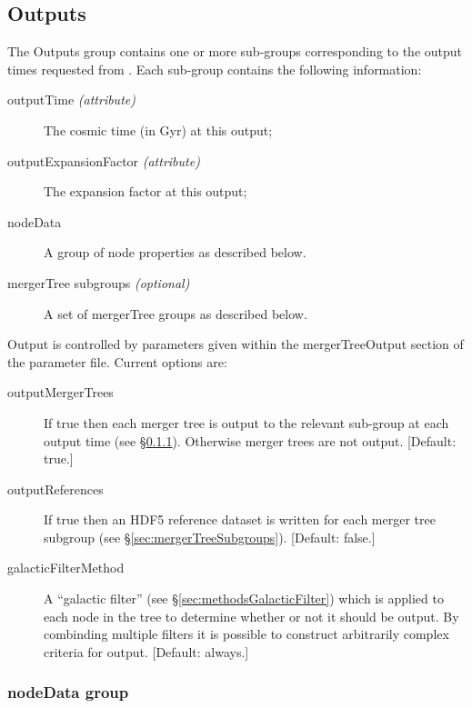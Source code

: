 \subsection{Outputs}

The {\normalfont \ttfamily Outputs} group contains one or more sub-groups corresponding to the output times requested from \glc. Each sub-group contains the following information:
\begin{description}
 \item[{\normalfont \ttfamily outputTime} \emph{(attribute)}] The cosmic time (in Gyr) at this output;
 \item[{\normalfont \ttfamily outputExpansionFactor} \emph{(attribute)}] The expansion factor at this output;
 \item[{\normalfont \ttfamily nodeData}] A group of node properties as described below.
 \item[{\normalfont \ttfamily mergerTree} subgroups \emph{(optional)}] A set of {\normalfont \ttfamily mergerTree} groups as described below.
\end{description}

Output is controlled by parameters given within the {\normalfont \ttfamily mergerTreeOutput} section of the parameter file. Current options are:
\begin{description}
\item[{\normalfont \ttfamily outputMergerTrees}] If {\normalfont \ttfamily true} then each merger tree is output to the relevant sub-group at each output time (see \S\ref{sec:nodeDataGroup}). Otherwise merger trees are not output. [Default: {\normalfont \ttfamily true}.]
\item[{\normalfont \ttfamily outputReferences}] If {\normalfont \ttfamily true} then an HDF5 reference dataset is written for each merger tree subgroup (see \S\ref{sec:mergerTreeSubgroups}). [Default: {\normalfont \ttfamily false}.]
\item[{\normalfont \ttfamily galacticFilterMethod}] A ``galactic filter'' (see \S\ref{sec:methodsGalacticFilter}) which is applied to each node in the tree to determine whether or not it should be output. By combinding multiple filters it is possible to construct arbitrarily complex criteria for output. [Default: {\normalfont \ttfamily always}.]
\end{description}

\subsubsection{nodeData group}\label{sec:nodeDataGroup}

